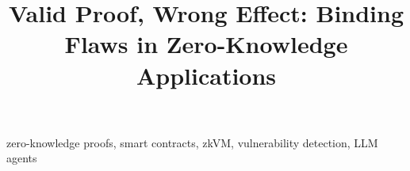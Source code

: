 \documentclass[compsoc,conference,a4paper,10pt,times]{IEEEtran}
\begin{document}
\title{Valid Proof, Wrong Effect: Binding Flaws in Zero-Knowledge Applications}
\author{}
\maketitle
\begin{abstract}\end{abstract}
\begin{IEEEkeywords}
zero-knowledge proofs, smart contracts, zkVM, vulnerability detection, LLM agents
\end{IEEEkeywords}











\appendices

\end{document}
